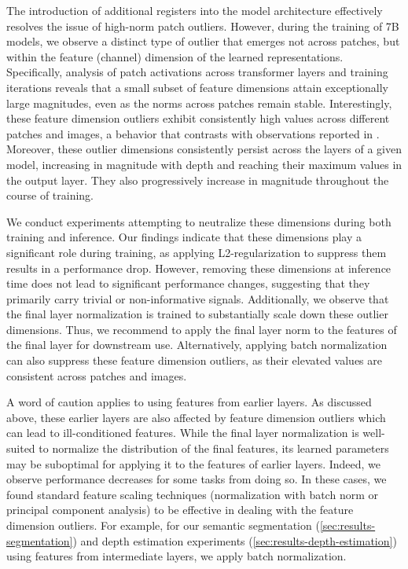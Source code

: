 The introduction of additional registers into the model architecture effectively resolves the issue of high-norm patch outliers. However, during the training of 7B models, we observe a distinct type of outlier that emerges not across patches, but within the feature (channel) dimension of the learned representations. Specifically, analysis of patch activations across transformer layers and training iterations reveals that a small subset of feature dimensions attain exceptionally large magnitudes, even as the norms across patches remain stable. Interestingly, these feature dimension outliers exhibit consistently high values across different patches and images, a behavior that contrasts with observations reported in \citep{an2025systematic}. Moreover, these outlier dimensions consistently persist across the layers of a given model, increasing in magnitude with depth and reaching their maximum values in the output layer. They also progressively increase in magnitude throughout the course of training.

We conduct experiments attempting to neutralize these dimensions during both training and inference. 
Our findings indicate that these dimensions play a significant role during training, as applying L2-regularization to suppress them results in a performance drop. 
However, removing these dimensions at inference time does not lead to significant performance changes, suggesting that they primarily carry trivial or non-informative signals. 
Additionally, we observe that the final layer normalization is trained to substantially scale down these outlier dimensions. 
Thus, we recommend to apply the final layer norm to the features of the final layer for downstream use.
Alternatively, applying batch normalization can also suppress these feature dimension outliers, as their elevated values are consistent across patches and images.

A word of caution applies to using features from earlier layers. 
As discussed above, these earlier layers are also affected by feature dimension outliers which can lead to ill-conditioned features.
While the final layer normalization is well-suited to normalize the distribution of the final features, its learned parameters may be suboptimal for applying it to the features of earlier layers. 
Indeed, we observe performance decreases for some tasks from doing so. 
In these cases, we found standard feature scaling techniques (\eg normalization with batch norm or principal component analysis) to be effective in dealing with the feature dimension outliers.
For example, for our semantic segmentation (\cref{sec:results-segmentation}) and depth estimation experiments (\cref{sec:results-depth-estimation}) using features from intermediate layers, we apply batch normalization.

 



